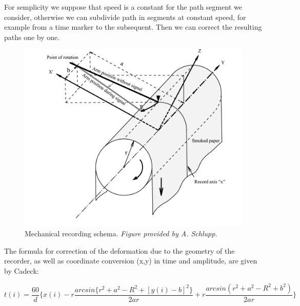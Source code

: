 \documentclass[a4paper,11pt]{article}
\begin{document}
For semplicity we suppose that speed is a constant for the path segment we consider, otherwise we can subdivide path in segments at constant speed, for example from a time marker to the subsequent. Then we can correct the resulting paths one by one. 

\begin{figure}[!ht]
\begin{center}
\includegraphics[width=14cm]{images/figure_III.2.png}
\caption{Mechanical recording schema.
{\itshape Figure provided by A. Schlupp.}
}
\label{fig:teseomrschema1}
\end{center}
\end{figure}

The formula for correction of the deformation due to the geometry of the recorder, as well as coordinate conversion (x,y) in time and amplitude, are given by Cadeck:

{\small
$$
t(i)= \frac{60}{d} \{ x(i) -r \frac{ arcsin \{ r^2+a^2 -R^2 +[y(i)-b]^2 \}}{ 2 a r } + r \frac{ arcsin ( r^2+a^2 -R^2 +b^2 )}{2 a r} \}
$$
}
\end{document}
